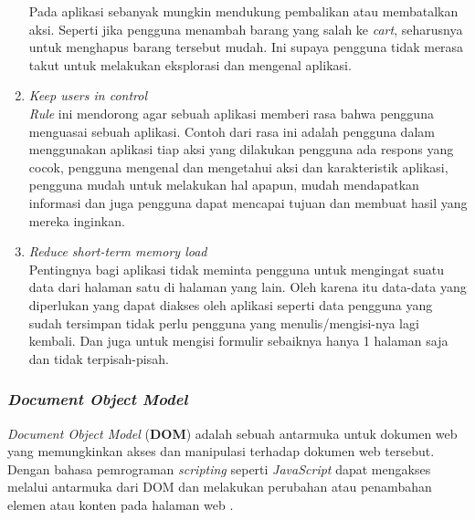 \documentclass[a4paper]{article}
\newcommand{\subsubbab}[1]{%
    \subsubsection{#1}%
}
\begin{document}
\begin{enumerate}
    Pada aplikasi sebanyak mungkin mendukung pembalikan atau membatalkan aksi. Seperti jika pengguna menambah barang yang salah ke \textit{cart}, seharusnya untuk menghapus barang tersebut mudah. Ini supaya pengguna tidak merasa takut untuk melakukan eksplorasi dan mengenal aplikasi.
    \item \textit{Keep users in control}\\
    \textit{Rule} ini mendorong agar sebuah aplikasi memberi rasa bahwa pengguna menguasai sebuah aplikasi. Contoh dari rasa ini adalah pengguna dalam menggunakan aplikasi tiap aksi yang dilakukan pengguna ada respons yang cocok, pengguna mengenal dan mengetahui aksi dan karakteristik aplikasi, pengguna mudah untuk melakukan hal apapun, mudah mendapatkan informasi dan juga pengguna dapat mencapai tujuan dan membuat hasil yang mereka inginkan.
    \item \textit{Reduce short-term memory load}\\
    Pentingnya bagi aplikasi tidak meminta pengguna untuk mengingat suatu data dari halaman satu di halaman yang lain. Oleh karena itu data-data yang diperlukan yang dapat diakses oleh aplikasi seperti data pengguna yang sudah tersimpan tidak perlu pengguna yang menulis/mengisi-nya lagi kembali. Dan juga untuk mengisi formulir sebaiknya hanya 1 halaman saja dan tidak terpisah-pisah.
\end{enumerate}

\subsubbab{\textit{Document Object Model}}
\textit{Document Object Model} (\textbf{DOM}) adalah sebuah antarmuka untuk dokumen web yang memungkinkan akses dan manipulasi terhadap dokumen web tersebut. Dengan bahasa pemrograman \textit{scripting} seperti \textit{JavaScript} dapat mengakses melalui antarmuka dari DOM dan melakukan perubahan atau penambahan elemen atau konten pada halaman web \autocite{DOM_teori}.
\end{document}
